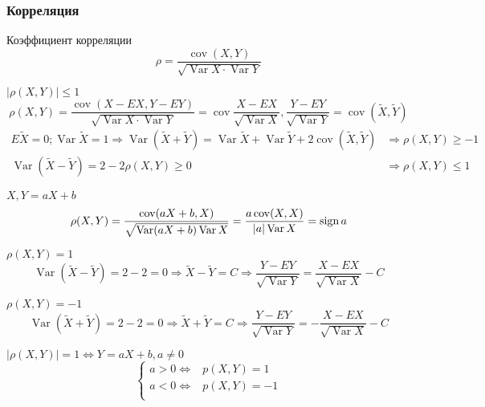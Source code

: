 \documentclass{article}
\DeclareMathOperator{\Var}{Var}
\DeclareMathOperator{\cov}{cov}
\begin{document}
    \subsubsection{Корреляция}
    \begin{definition}{Коэффициент корреляции}
        $$ \rho = \frac{\cov (X, Y) }{\sqrt{\Var X \cdot \Var Y}}$$
    \end{definition}
    \begin{property}
        $|\rho(X, Y)| \le 1$
        $$ \rho(X, Y) = \frac{\cov (X - EX, Y - EY) }{\sqrt{\Var X \cdot \Var Y}} = \cov {\frac{X - EX}{\sqrt{\Var X}}, \frac{Y - EY}{\sqrt{\Var Y}}} = \cov(\widetilde{X}, \widetilde{Y}) $$
        \begin{align*}
         E\widetilde{X} = 0; \Var\widetilde{X} = 1 \Rightarrow \Var(\widetilde{X} + \widetilde{Y}) = 
        \Var\widetilde{X} +  \Var\widetilde{Y} + 2\cov(\widetilde{X}, \widetilde{Y}) &\Rightarrow \rho(X, Y) \ge -1 \\
        \Var (\widetilde{X} - \widetilde{Y}) = 2 - 2 \rho (X, Y) \ge 0 &\Rightarrow \rho (X, Y) \le 1
        \end{align*}
    \end{property}
    \begin{property}
        $X, Y = aX + b$
        $$ \rho (X, Y) = \frac{\cov(aX+b, X)}{\sqrt{\Var(aX+b)\Var X}} = \frac{a \cov(X, X) }{|a| \Var X} = \sign a$$
    \end{property}
    \begin{property}
        $\rho(X, Y) = 1$
        $$ \Var (\widetilde{X} - \widetilde{Y}) = 2 - 2 = 0 \Rightarrow \widetilde{X} - \widetilde{Y} = C \Rightarrow \frac{Y - EY}{\sqrt{\Var Y}} = \frac{X - EX}{\sqrt{\Var X}} - C $$
    \end{property}
    \begin{property}
        $\rho(X, Y) = -1$
        $$ \Var (\widetilde{X} + \widetilde{Y}) = 2 - 2 = 0 \Rightarrow \widetilde{X} + \widetilde{Y} = C \Rightarrow \frac{Y - EY}{\sqrt{\Var Y}} = -\frac{X - EX}{\sqrt{\Var X}} - C$$
    \end{property}
    \begin{property}
        $|\rho(X, Y)| = 1 \Leftrightarrow Y = aX + b, a \ne 0 $
        $$
            \begin{cases}
                a > 0 \Leftrightarrow& p(X, Y) = 1\\
                a < 0 \Leftrightarrow& p(X, Y) = -1\\
            \end{cases}
        $$
        
    \end{property}
\end{document}
